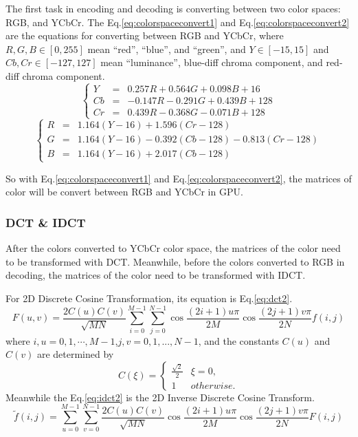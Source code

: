 \documentclass{article}
\begin{document}
The first task in encoding and decoding is converting between two color spaces: RGB, and YCbCr.
The Eq.\ref{eq:colorspaceconvert1} and Eq.\ref{eq:colorspaceconvert2} are the equations for converting
between RGB and YCbCr, where $R,G,B \in \left[0,255\right]$ mean ``red'', ``blue'', and ``green'',
and $Y \in \left[-15,15\right]$ and $Cb,Cr \in \left[-127,127\right]$ mean ``luminance'', blue-diff chroma component, and red-diff chroma component.
\begin{equation}
    \label{eq:colorspaceconvert1}
    \left\{\begin{array}{rcl}
    Y  &=& 0.257R+0.564G+0.098B+16 \\
    Cb &=& -0.147R-0.291G+0.439B+128 \\
    Cr &=& 0.439R-0.368G-0.071B+128
    \end{array}\right.
\end{equation}
\begin{equation}
    \label{eq:colorspaceconvert2}
    \left\{\begin{array}{rcl}
    R &=& 1.164(Y-16) + 1.596(Cr-128) \\
    G &=& 1.164(Y-16) - 0.392(Cb-128)-0.813(Cr-128) \\
    B &=& 1.164(Y-16) + 2.017(Cb-128)
    \end{array}\right.
\end{equation}

So with Eq.\ref{eq:colorspaceconvert1} and Eq.\ref{eq:colorspaceconvert2},
the matrices of color will be convert between RGB and YCbCr in GPU.

\subsubsection{DCT \& IDCT}
\label{sec:hpeg:inside:dct}

After the colors converted to YCbCr color space, the matrices of the color need to be transformed with DCT.
Meanwhile, before the colors converted to RGB in decoding, the matrices of the color need to be transformed
with IDCT.

For 2D Discrete Cosine Transformation, its equation is Eq.\ref{eq:dct2}.
\begin{equation}
\label{eq:dct2}
F(u,v) = \frac{2C(u)C(v)}{\sqrt{MN}}\sum\limits_{i=0}^{M-1}\sum\limits_{j=0}^{N-1}\cos{\frac{(2i+1)u\pi}{2M}}\cos{\frac{(2j+1)v\pi}{2N}}f(i,j)
\end{equation}
where $i,u=0,1,\cdots,M-1$,$j,v=0,1,...,N-1$, and the constants $C(u)$ and $C(v)$ are determined by
\begin{equation}
\label{eq:2dct}
C(\xi) = \left\{
\begin{array}{cc}
\frac{\sqrt{2}}{2} & \xi = 0, \\
1 & otherwise.
\end{array}\right.
\end{equation}
Meanwhile the Eq.\ref{eq:idct2} is the 2D Inverse Discrete Cosine Transform.
\begin{equation}
\label{eq:idct2}
\widetilde{f}(i,j) = \sum\limits_{u=0}^{M-1}\sum\limits_{v=0}^{N-1}\frac{2C(u)C(v)}{\sqrt{MN}}\cos{\frac{(2i+1)u\pi}{2M}}\cos{\frac{(2j+1)v\pi}{2N}}F(i,j)
\end{equation} 
\end{document}
